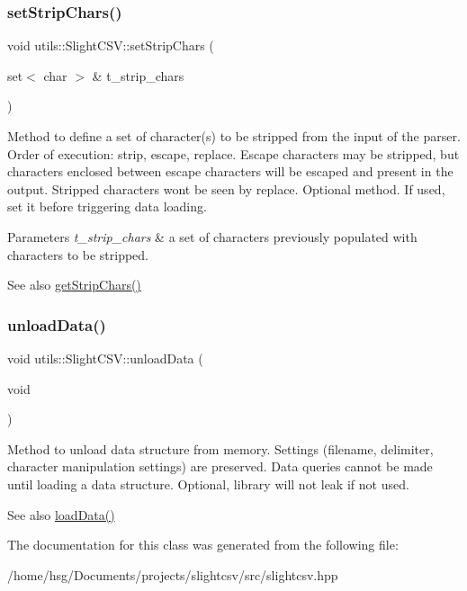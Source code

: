 \subsubsection{\texorpdfstring{set\+Strip\+Chars()}{setStripChars()}}
{\footnotesize\ttfamily void utils\+::\+Slight\+C\+S\+V\+::set\+Strip\+Chars (\begin{DoxyParamCaption}\item[{set$<$ char $>$ \&}]{t\+\_\+strip\+\_\+chars }\end{DoxyParamCaption})}

Method to define a set of character(s) to be stripped from the input of the parser. Order of execution\+: strip, escape, replace. Escape characters may be stripped, but characters enclosed between escape characters will be escaped and present in the output. Stripped characters won\textquotesingle{}t be seen by replace. Optional method. If used, set it before triggering data loading. 
\begin{DoxyParams}{Parameters}
{\em t\+\_\+strip\+\_\+chars} & a set of characters previously populated with characters to be stripped. \\
\hline
\end{DoxyParams}
\begin{DoxySeeAlso}{See also}
\hyperlink{classutils_1_1SlightCSV_a13d435b5e07c827f6688efa9bf4673d4}{get\+Strip\+Chars()} 
\end{DoxySeeAlso}
\mbox{\label{classutils_1_1SlightCSV_aaa9c8042d6231660cb08ada7c1a8dccb}} 
\subsubsection{\texorpdfstring{unload\+Data()}{unloadData()}}
{\footnotesize\ttfamily void utils\+::\+Slight\+C\+S\+V\+::unload\+Data (\begin{DoxyParamCaption}\item[{void}]{ }\end{DoxyParamCaption})}

Method to unload data structure from memory. Settings (filename, delimiter, character manipulation settings) are preserved. Data queries cannot be made until loading a data structure. Optional, library will not leak if not used. \begin{DoxySeeAlso}{See also}
\hyperlink{classutils_1_1SlightCSV_adea079ec76c9ee67d096f8fd39946380}{load\+Data()} 
\end{DoxySeeAlso}


The documentation for this class was generated from the following file\+:\begin{DoxyCompactItemize}
\item 
/home/hsg/\+Documents/projects/slightcsv/src/slightcsv.\+hpp\end{DoxyCompactItemize}
